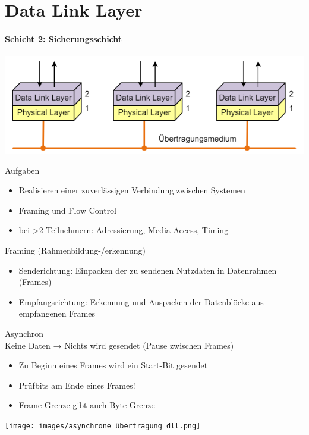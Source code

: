 \section{Data Link Layer}
\paragraph{Schicht 2: Sicherungsschicht}
\vspace{-1mm}
\includegraphics[width=0.5\linewidth]{images/data_link_layer.png}
\begin{definition}{Aufgaben}
    \begin{itemize}
        \item Realisieren einer zuverlässigen Verbindung zwischen Systemen
        \item Framing und Flow Control
        \item bei >2 Teilnehmern: Adressierung, Media Access, Timing
    \end{itemize}
\end{definition}

\begin{definition}{Framing (Rahmenbildung-/erkennung)}
    \begin{itemize}
        \item Senderichtung: Einpacken der zu sendenen Nutzdaten in Datenrahmen (Frames)
        \item Empfangsrichtung: Erkennung und Auspacken der Datenblöcke aus empfangenen Frames
    \end{itemize}
\end{definition}

\begin{concept}{Asynchron}\\
    Keine Daten → Nichts wird gesendet (Pause zwischen Frames)
    \begin{itemize}
        \item Zu Beginn eines Frames wird ein Start-Bit gesendet
        \item Prüfbits am Ende eines Frames!
        \item Frame-Grenze gibt auch Byte-Grenze
    \end{itemize}
    \texttt{[image: images/asynchrone\_übertragung\_dll.png]}
\end{concept}

